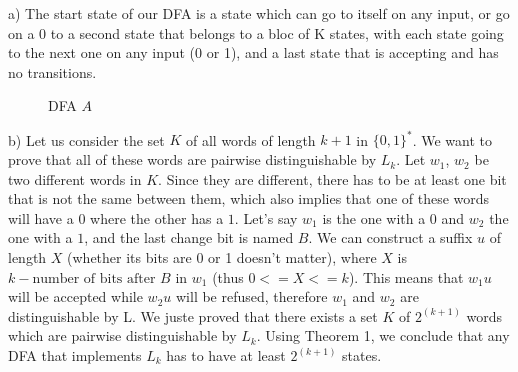 
a) The start state of our DFA is a state which can go to itself on any input, or go on a 0 to a second state that belongs to a bloc of K states, with each state going to the next one on any input (0 or 1), and a last state that is accepting and has no transitions.

\begin{figure}[H]
\centering
{}
\caption{DFA $A$}
\end{figure}

b) Let us consider the set $K$ of all words of length $k+1$ in $\{0,1\}^*$. We want to prove that all of these words are pairwise distinguishable by $L_k$. Let $w_1$, $w_2$ be two different words in $K$. Since they are different, there has to be at least one bit that is not the same between them, which also implies that one of these words will have a $0$ where the other has a $1$. Let's say $w_1$ is the one with a $0$ and $w_2$ the one with a $1$, and the last change bit is named $B$. We can construct a suffix $u$ of length $X$ (whether its bits are 0 or 1 doesn't matter), where $X$ is $k - \text{number of bits after }B\text { in }w_1$ (thus $0 <= X <= k$).
This means that $w_1u$ will be accepted while $w_2u$ will be refused, therefore $w_1$ and $w_2$ are distinguishable by L.
We juste proved that there exists a set $K$ of $2^{(k+1)}$ words which are pairwise distinguishable by $L_k$. Using Theorem 1, we conclude that any DFA that implements $L_k$ has to have at least $2^{(k+1)}$ states.
